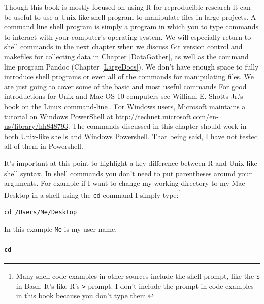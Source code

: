 \documentclass[krantz1]{krantz}
\begin{document}
Though this book is mostly focused on using R for reproducible research it can be useful to use a Unix-like shell program to manipulate files in large projects. A command line shell program is simply a program in which you to type commands to interact with your computer's operating system. We will especially return to shell commands in the next chapter when we discuss Git version control and makefiles for collecting data in Chapter \ref{DataGather}, as well as the command line program Pandoc (Chapter \ref{LargeDocs}). We don't have enough space to fully introduce shell programs or even all of the commands for manipulating files. We are just going to cover some of the basic and most useful commands For good introductions for Unix and Mac OS 10 computers see William E. Shotts Jr.'s book on the Linux command-line \cite[]{ShottsJr2012}. For Windows users, Microsoft maintains a tutorial on Windows PowerShell at \url{http://technet.microsoft.com/en-us/library/hh848793}. The commands discussed in this chapter should work in both Unix-like shells and Windows Powershell. That being said, I have not tested all of them in Powershell. 

It's important at this point to highlight a key difference between R and Unix-like shell syntax. In shell commands you don't need to put parentheses around your arguments. For example if I want to change my working directory to my Mac Desktop in a shell using the \texttt{cd} command I simply type:\footnote{Many shell code examples in other sources include the shell prompt, like the \texttt{\$} in Bash. It's like R's \texttt{\textgreater} prompt. I don't include the prompt in code examples in this book because you don't type them.}

\begin{knitrout}
\color{fgcolor}\begin{kframe}
\begin{verbatim}
cd /Users/Me/Desktop
\end{verbatim}
\end{kframe}
\end{knitrout}


\noindent In this example \texttt{Me} is my user name. 

\paragraph{{\tt{cd}}}
\end{document}
